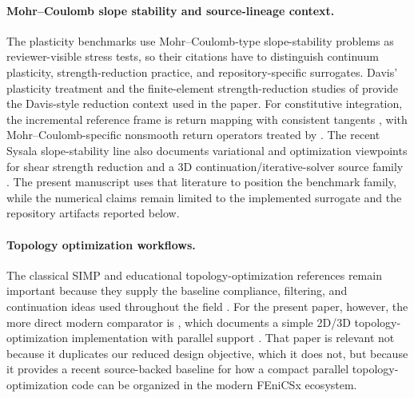 \paragraph{Mohr--Coulomb slope stability and source-lineage context.}
The plasticity benchmarks use Mohr--Coulomb-type slope-stability problems as
reviewer-visible stress tests, so their citations have to distinguish continuum
plasticity, strength-reduction practice, and repository-specific surrogates.
Davis' plasticity treatment and the finite-element strength-reduction studies of
\citet{tschuchnigg2015nonassociated} provide the Davis-style reduction context
used in the paper. For constitutive integration, the incremental reference frame
is return mapping with consistent tangents \citep{simo1985consistent,simo1998compinel},
with Mohr--Coulomb-specific nonsmooth return operators treated by
\citet{sysala2017returnmapping}. The recent Sysala slope-stability line also
documents variational and optimization viewpoints for shear strength reduction
\citep{sysala2021optimization,sysala2025convexoptimization} and a 3D
continuation/iterative-solver source family \citep{sysala2025advancedcontinuation}.
The present manuscript uses that literature to position the benchmark family,
while the numerical claims remain limited to the implemented surrogate and the
repository artifacts reported below.

\paragraph{Topology optimization workflows.}
The classical SIMP and educational topology-optimization references remain
important because they supply the baseline compliance, filtering, and
continuation ideas used throughout the field
\citep{sigmund2001topology,bendsoe2003topology,ferrari2020top99,bourdin2001filters}.
For the present paper, however, the more direct modern comparator is
, which documents a simple 2D/3D  topology-optimization
implementation with parallel support \citep{jia2024fenitop}. That paper is
relevant not because it duplicates our reduced design objective, which it does
not, but because it provides a recent source-backed baseline for how a compact
parallel topology-optimization code can be organized in the modern FEniCSx
ecosystem.

